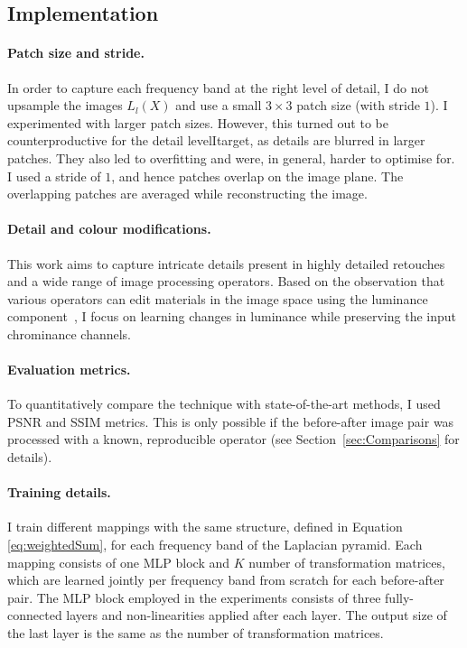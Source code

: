 
\subsection{Implementation}
\label{sec:Implementation}

\paragraph{Patch size and stride.} In order to capture each frequency band at the right level of detail, I do not upsample the images $L_l(X)$ and use a small $3 \times 3$ patch size (with stride $1$). I experimented with larger patch sizes. However, this turned out to be counterproductive for the detail levelItarget, as details are blurred in larger patches. They also led to overfitting and were, in general, harder to optimise for. I used a stride of $1$, and hence patches overlap on the image plane. The overlapping patches are averaged while reconstructing the image.

\paragraph{Detail and colour modifications.} This work aims to capture intricate details present in highly detailed retouches and a wide range of image processing operators. Based on the observation that various operators can edit materials in the image space using the luminance component~\cite{Boyadzhiev15Band}, I focus on learning changes in luminance while preserving the input chrominance channels. 

\paragraph{Evaluation metrics.} To quantitatively compare the technique with state-of-the-art methods, I used PSNR and SSIM metrics. This is only possible if the before-after image pair was processed with a known, reproducible operator (see Section~\ref{sec:Comparisons} for details).


\paragraph{Training details.}\label{train_det} I train different mappings with the same structure, defined in Equation \ref{eq:weightedSum}, for each frequency band of the Laplacian pyramid. Each mapping consists of one MLP block and $K$ number of transformation matrices, which are learned jointly per frequency band from scratch for each before-after pair. The MLP block employed in the experiments consists of three fully-connected layers and non-linearities applied after each layer. The output size of the last layer is the same as the number of transformation matrices.

